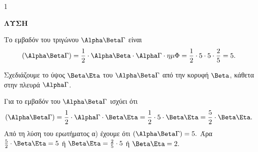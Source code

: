 \begin{ylh}{1}
    \item [Ύλη από εικόνα]
\end{ylh}
\begin{figure}
    \centering
\end{figure}
\textbf{ΛΥΣΗ}

\begin{alist}
    \item Το εμβαδόν του τριγώνου $\Alpha\Beta\Gamma$ είναι
    \[ (\Alpha\Beta\Gamma) = \frac{1}{2} \cdot \Alpha\Beta \cdot \Alpha\Gamma \cdot \eta\mu\Phi = \frac{1}{2} \cdot 5 \cdot 5 \cdot \frac{2}{5} = 5. \]
    \item Σχεδιάζουμε το ύψος $\Beta\Eta$ του $\Alpha\Beta\Gamma$ από την κορυφή $\Beta$, κάθετα στην πλευρά $\Alpha\Gamma$.
    
    Για το εμβαδόν του $\Alpha\Beta\Gamma$ ισχύει ότι
    \[ (\Alpha\Beta\Gamma) = \frac{1}{2} \cdot \Alpha\Gamma \cdot \Beta\Eta = \frac{1}{2} \cdot 5 \cdot \Beta\Eta = \frac{5}{2} \cdot \Beta\Eta. \]
    Από τη λύση του ερωτήματος α) έχουμε ότι $(\Alpha\Beta\Gamma)=5.$
    Άρα $\frac{5}{2} \cdot \Beta\Eta=5$ ή $\Beta\Eta=\frac{2}{5} \cdot 5$ ή $\Beta\Eta=2.$
\end{alist}